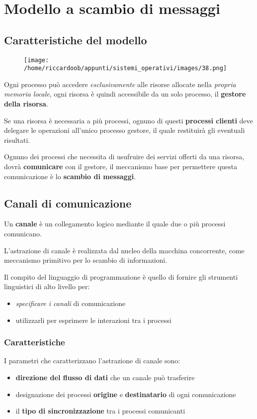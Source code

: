 \chapter{Modello a scambio di messaggi}

\section{Caratteristiche del modello}
\begin{figure}[H]
    \centering
    \texttt{[image: /home/riccardoob/appunti/sistemi\_operativi/images/38.png]}
\end{figure}

Ogni processo può accedere \textit{esclusivamente} alle risorse allocate nella \textit{propria memoria locale}, ogni risorsa è quindi accessibile da un solo processo, il \textbf{gestore della risorsa}.

Se una risorsa è necessaria a più processi, ognuno di questi \textbf{processi clienti} deve delegare le operazioni all'unico processo gestore, il quale restituirà gli eventuali risultati.

Ognuno dei processi che necessita di usufruire dei servizi offerti da una risorsa, dovrà \textbf{comunicare} con il gestore, il meccanismo base per permettere questa comunicazione è lo \textbf{scambio di messaggi}.

\section{Canali di comunicazione}
\begin{mdframed}[topline=false,bottomline=false,rightline=false]
Un \textbf{canale} è un collegamento logico mediante il quale due o più processi comunicano.
\end{mdframed}

L'astrazione di canale è realizzata dal nucleo della macchina concorrente, come meccanismo primitivo per lo scambio di informazioni.

Il compito del linguaggio di programmazione è quello di fornire gli strumenti linguistici di alto livello per:
\begin{itemize}
    \item \textit{specificare i canali} di comunicazione
    \item utilizzarli per esprimere le interazioni tra i processi
\end{itemize}

\subsection{Caratteristiche}
I parametri che caratterizzano l'astrazione di canale sono:
\begin{itemize}
    \item \textbf{direzione del flusso di dati} che un canale può trasferire
    \item designazione dei processi \textbf{origine} e \textbf{destinatario} di ogni comunicazione
    \item il \textbf{tipo di sincronizzazione} tra i processi comunicanti
\end{itemize}

